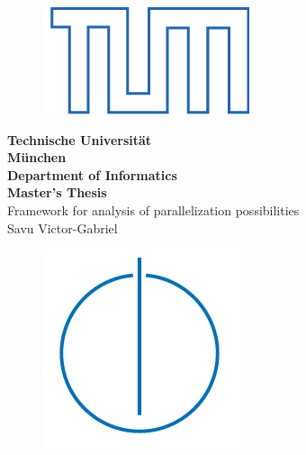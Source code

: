 \documentclass[a4paper,12pt]{book}
\begin{document}
\frontmatter

\begin{titlepage}

\begin{center}
	\bigskip \bigskip \bigskip 
	\begin{figure}[ht]
		\centering \includegraphics[width=0.2\linewidth]{logo.png}
	\end{figure}
	\vspace*{0.8cm}
	{\huge \bf Technische Universität} \\
	\bigskip
	{\huge \bf München} \\
	\bigskip \bigskip \bigskip
	{\huge \bf Department of Informatics} \\
	\bigskip \bigskip \bigskip
	{\Large \bf Master's Thesis} \\
	\bigskip \bigskip \bigskip \bigskip \bigskip
	{\Large Framework for analysis of parallelization possibilities} \\        
	\bigskip \bigskip \bigskip \bigskip
	{\Large Savu Victor-Gabriel} \\    
	\bigskip
	\begin{figure}[ht]
		\centering \includegraphics[width=0.2\linewidth]{infologo.jpg}
	\end{figure}
	\bigskip 
\end{center}

\end{titlepage}

\tableofcontents

\mainmatter






\backmatter
{}

\end{document}
